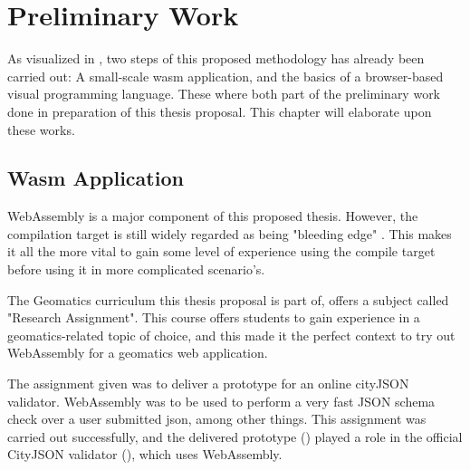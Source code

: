 

\section{Preliminary Work}
\label{sec:preliminary}

As visualized in , two steps of this proposed methodology has already been carried out: A small-scale wasm application, and the basics of a browser-based visual programming language. These where both part of the preliminary work done in preparation of this thesis proposal. This chapter will elaborate upon these works.


\subsection{Wasm Application}
\label{sec:preliminary-wasm}

WebAssembly is a major component of this proposed thesis. However, the compilation target is still widely regarded as being "bleeding edge" \cite{jangda_not_2019}. This makes it all the more vital to gain some level of experience using the compile target before using it in more complicated scenario's. 

The Geomatics curriculum this thesis proposal is part of, offers a subject called "Research Assignment". This course offers students to gain experience in a geomatics-related topic of choice, and this made it the perfect context to try out WebAssembly for a geomatics web application.

The assignment given was to deliver a prototype for an online cityJSON validator. 
WebAssembly was to be used to perform a very fast JSON schema check over a user submitted json, among other things. 
This assignment was carried out successfully, and the delivered prototype () played a role in the official CityJSON validator (), which uses WebAssembly. 


